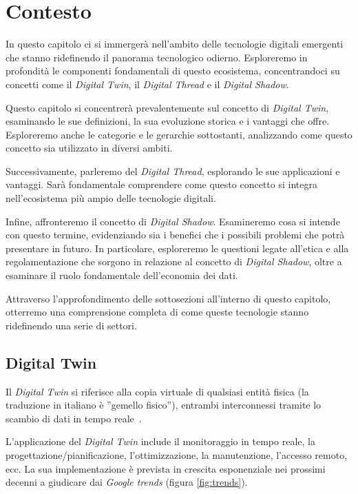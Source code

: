 \clearpage{\pagestyle{empty}\cleardoublepage}
\chapter{Contesto}
\lhead[\fancyplain{}{\bfseries\thepage}]{\fancyplain{}{\bfseries\rightmark}}

In questo capitolo ci si immergerà nell'ambito delle tecnologie digitali emergenti che stanno ridefinendo il panorama tecnologico odierno. Esploreremo in profondità le componenti fondamentali di questo ecosistema, concentrandoci su concetti come il \emph{Digital Twin}, il \emph{Digital Thread} e il \emph{Digital Shadow}.

Questo capitolo si concentrerà prevalentemente sul concetto di \emph{Digital Twin}, esaminando le sue definizioni, la sua evoluzione storica e i vantaggi che offre. Esploreremo anche le categorie e le gerarchie sottostanti, analizzando come questo concetto sia utilizzato in diversi ambiti.

Successivamente, parleremo del \emph{Digital Thread}, esplorando le sue applicazioni e vantaggi. Sarà fondamentale comprendere come questo concetto si integra nell'ecosistema più ampio delle tecnologie digitali.

Infine, affronteremo il concetto di \emph{Digital Shadow}. Esamineremo cosa si intende con questo termine, evidenziando sia i benefici che i possibili problemi che potrà presentare in futuro. In particolare, esploreremo le questioni legate all'etica e alla regolamentazione che sorgono in relazione al concetto di \emph{Digital Shadow}, oltre a esaminare il ruolo fondamentale dell'economia dei dati.

Attraverso l'approfondimento delle sottosezioni all'interno di questo capitolo, otterremo una comprensione completa di come queste tecnologie stanno ridefinendo una serie di settori.


\section{Digital Twin}

Il \emph{Digital Twin} si riferisce alla copia virtuale di qualsiasi entità fisica (la traduzione in italiano è ”gemello fisico”), entrambi interconnessi tramite lo scambio di dati in tempo reale~\cite{NASA}.

L'applicazione del \emph{Digital Twin} include il monitoraggio in tempo reale, la progettazione/pianificazione, l'ottimizzazione, la manutenzione, l'accesso remoto, ecc. La sua implementazione è prevista in crescita esponenziale nei prossimi decenni a giudicare dai \emph{Google trends} (figura \ref{fig:trends}).

